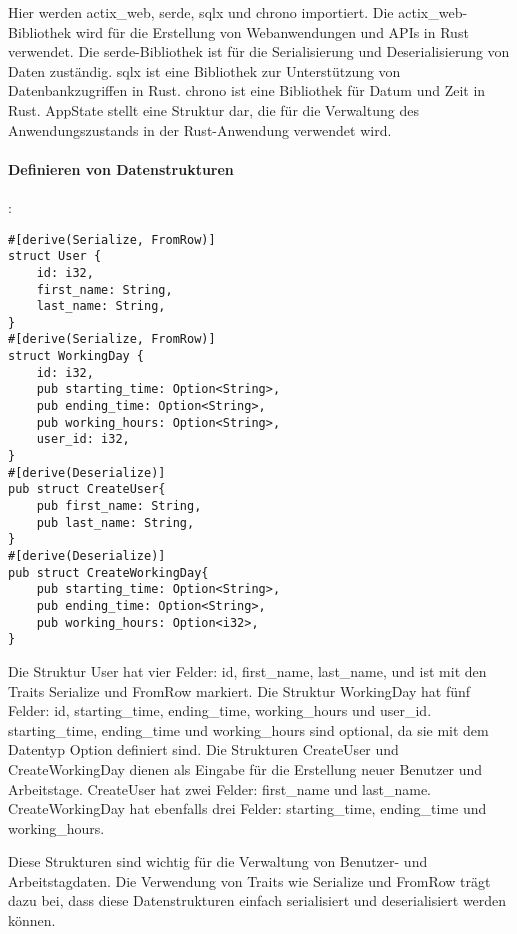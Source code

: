 Hier werden actix\_web, serde, sqlx und chrono importiert.
Die actix\_web-Bibliothek wird für die Erstellung von Webanwendungen und APIs in Rust verwendet. 
Die serde-Bibliothek ist für die Serialisierung und Deserialisierung von Daten zuständig. 
sqlx ist eine Bibliothek zur Unterstützung von Datenbankzugriffen in Rust. 
chrono ist eine Bibliothek für Datum und Zeit in Rust.
AppState stellt eine Struktur dar, die für die Verwaltung des Anwendungszustands in der Rust-Anwendung verwendet wird.

\paragraph{Definieren von Datenstrukturen}:
\begin{verbatim}
#[derive(Serialize, FromRow)]
struct User {
    id: i32,
    first_name: String,
    last_name: String,
}
#[derive(Serialize, FromRow)]
struct WorkingDay {
    id: i32,
    pub starting_time: Option<String>,
    pub ending_time: Option<String>,
    pub working_hours: Option<String>,
    user_id: i32,
}
#[derive(Deserialize)]
pub struct CreateUser{
    pub first_name: String,
    pub last_name: String,
}
#[derive(Deserialize)]
pub struct CreateWorkingDay{
    pub starting_time: Option<String>,
    pub ending_time: Option<String>,
    pub working_hours: Option<i32>,
}
\end{verbatim}
Die Struktur User hat vier Felder: id, first\_name, last\_name, und ist mit den Traits Serialize und FromRow markiert.
Die Struktur WorkingDay hat fünf Felder: id, starting\_time, ending\_time, working\_hours und user\_id. starting\_time, ending\_time und working\_hours sind optional, da sie mit dem Datentyp Option definiert sind. 
Die Strukturen CreateUser und CreateWorkingDay dienen als Eingabe für die Erstellung neuer Benutzer und Arbeitstage. CreateUser hat zwei Felder: first\_name und last\_name. CreateWorkingDay hat ebenfalls drei Felder: starting\_time, ending\_time und working\_hours.

Diese Strukturen sind wichtig für die Verwaltung von Benutzer- und Arbeitstagdaten. Die Verwendung von Traits wie Serialize und FromRow trägt dazu bei, dass diese Datenstrukturen einfach serialisiert und deserialisiert werden können.

